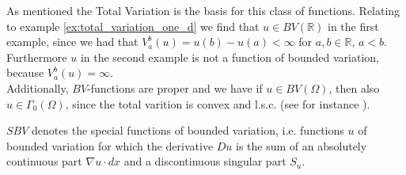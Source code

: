    As mentioned the Total Variation is the basis for this class of functions. Relating to example \ref{ex:total_variation_one_d} we find that $u \in BV(\mathbb{R})$ in the first example, since we had that $V^{b}_{a}(u) = u(b) - u(a) < \infty$ for $a, b \in \mathbb{R}$, $a < b$. Furthermore $u$ in the second example is not a function of bounded variation, because $V^{b}_{a}(u) = \infty$.\\
    Additionally, $BV$-functions are proper and we have if $u \in BV(\Omega)$, then also $u \in \Gamma_{0}(\Omega)$, since the total varition is convex and l.s.c. (see for instance \cite{Chambolle-et-al-10}).

    \begin{definition}
        $SBV$ denotes the special functions of bounded variation, i.e. functions $u$ of bounded variation for which the derivative $Du$ is the sum of an absolutely continuous part $\nabla u \cdot dx$ and a discontinuous singular part $S_{u}$.
    \end{definition}


